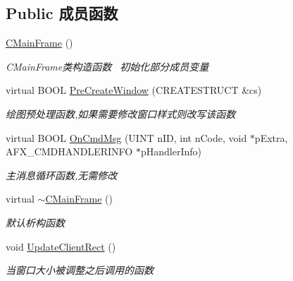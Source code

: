 \subsection*{Public 成员函数}
\begin{DoxyCompactItemize}
\item 
\hyperlink{class_c_main_frame_af3e997aeae4148d2aaa4a1e1ae7bdd53}{C\+Main\+Frame} ()
\begin{DoxyCompactList}\small\item\em C\+Main\+Frame类构造函数~\newline
初始化部分成员变量 \end{DoxyCompactList}\item 
\mbox{\label{class_c_main_frame_a549bf677c955c2898c3c683321633c16}} 
virtual B\+O\+OL \hyperlink{class_c_main_frame_a549bf677c955c2898c3c683321633c16}{Pre\+Create\+Window} (C\+R\+E\+A\+T\+E\+S\+T\+R\+U\+CT \&cs)
\begin{DoxyCompactList}\small\item\em 绘图预处理函数,如果需要修改窗口样式则改写该函数 \end{DoxyCompactList}\item 
\mbox{\label{class_c_main_frame_ade959eb0bab719bf06bb9b18ee407101}} 
virtual B\+O\+OL \hyperlink{class_c_main_frame_ade959eb0bab719bf06bb9b18ee407101}{On\+Cmd\+Msg} (U\+I\+NT n\+ID, int n\+Code, void $\ast$p\+Extra, A\+F\+X\+\_\+\+C\+M\+D\+H\+A\+N\+D\+L\+E\+R\+I\+N\+FO $\ast$p\+Handler\+Info)
\begin{DoxyCompactList}\small\item\em 主消息循环函数,无需修改 \end{DoxyCompactList}\item 
\mbox{\label{class_c_main_frame_a8ae555f23fdf97edb4feb4d3e1bfa4ee}} 
virtual \hyperlink{class_c_main_frame_a8ae555f23fdf97edb4feb4d3e1bfa4ee}{$\sim$\+C\+Main\+Frame} ()
\begin{DoxyCompactList}\small\item\em 默认析构函数 \end{DoxyCompactList}\item 
void \hyperlink{class_c_main_frame_a2500e3a6ace77e01430f5ff4b9a6f182}{Update\+Client\+Rect} ()
\begin{DoxyCompactList}\small\item\em 当窗口大小被调整之后调用的函数~\newline

\end{DoxyCompactList}
\end{DoxyCompactItemize}
